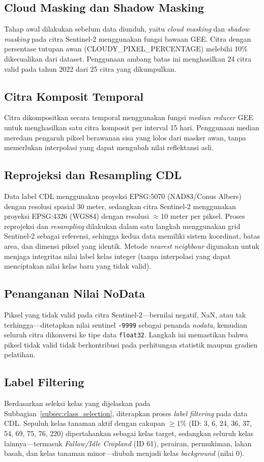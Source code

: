 \subsection{Cloud Masking dan Shadow Masking}
Tahap awal dilakukan sebelum data diunduh, yaitu \textit{cloud masking} dan \textit{shadow masking} pada citra Sentinel-2 menggunakan fungsi bawaan GEE.
Citra dengan persentase tutupan awan (CLOUDY\_PIXEL\_PERCENTAGE) melebihi 10\% dikecualikan dari dataset.
Penggunaan ambang batas ini menghasilkan 24 citra valid pada tahun 2022 dari 25 citra yang dikumpulkan.

\subsection{Citra Komposit Temporal}
Citra dikompositkan secara temporal menggunakan fungsi \textit{median reducer} GEE untuk menghasilkan satu citra komposit per interval 15 hari.
Penggunaan median meredam pengaruh piksel berawanan sisa yang lolos dari masker awan, tanpa memerlukan interpolasi yang dapat mengubah nilai reflektansi asli.

\subsection{Reprojeksi dan Resampling CDL}
Data label CDL menggunakan proyeksi EPSG:5070 (NAD83/Conus Albers) dengan resolusi spasial 30 meter, sedangkan citra Sentinel-2 menggunakan proyeksi EPSG:4326 (WGS84) dengan resolusi $\approx$10 meter per piksel.
Proses reprojeksi dan \textit{resampling} dilakukan dalam satu langkah menggunakan grid Sentinel-2 sebagai referensi, sehingga kedua data memiliki sistem koordinat, batas area, dan dimensi piksel yang identik.
Metode \textit{nearest neighbour} digunakan untuk menjaga integritas nilai label kelas integer (tanpa interpolasi yang dapat menciptakan nilai kelas baru yang tidak valid).

\subsection{Penanganan Nilai NoData}
Piksel yang tidak valid pada citra Sentinel-2---bernilai negatif, NaN, atau tak terhingga---ditetapkan nilai sentinel \texttt{-9999} sebagai penanda \textit{nodata}, kemudian seluruh citra dikonversi ke tipe data \texttt{float32}.
Langkah ini memastikan bahwa piksel tidak valid tidak berkontribusi pada perhitungan statistik maupun gradien pelatihan.

\subsection{Label Filtering}
Berdasarkan seleksi kelas yang dijelaskan pada Subbagian~\ref{subsec:class_selection}, diterapkan proses \textit{label filtering} pada data CDL.
Sepuluh kelas tanaman aktif dengan cakupan $\geq 1\%$ (ID: 3, 6, 24, 36, 37, 54, 69, 75, 76, 220) dipertahankan sebagai kelas target, sedangkan seluruh kelas lainnya---termasuk \textit{Fallow/Idle Cropland} (ID 61), perairan, permukiman, lahan basah, dan kelas tanaman minor---diubah menjadi kelas \textit{background} (nilai 0).

